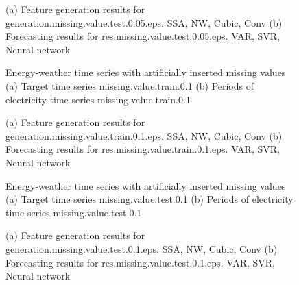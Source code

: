 \documentclass[12pt]{article}
\begin{document}
\begin{figure}
\centering
{}
\caption{(a)	Feature generation results for	generation.missing.value.test.0.05.eps.	SSA, NW, Cubic, Conv	(b)	Forecasting results for	res.missing.value.test.0.05.eps.	VAR, SVR, Neural network	}
\end{figure}


\begin{figure}
\centering
{}
\caption{Energy-weather time series with artificially inserted missing values	(a) Target time series	missing.value.train.0.1	(b) Periods of electricity time series	missing.value.train.0.1	}
\end{figure}


\begin{figure}
\centering
{}
\caption{(a)	Feature generation results for	generation.missing.value.train.0.1.eps.	SSA, NW, Cubic, Conv	(b)	Forecasting results for	res.missing.value.train.0.1.eps.	VAR, SVR, Neural network	}
\end{figure}


\begin{figure}
\centering
{}
\caption{Energy-weather time series with artificially inserted missing values	(a) Target time series	missing.value.test.0.1	(b) Periods of electricity time series	missing.value.test.0.1	}
\end{figure}


\begin{figure}
\centering
{}
\caption{(a)	Feature generation results for	generation.missing.value.test.0.1.eps.	SSA, NW, Cubic, Conv	(b)	Forecasting results for	res.missing.value.test.0.1.eps.	VAR, SVR, Neural network	}
\end{figure}
\end{document}
